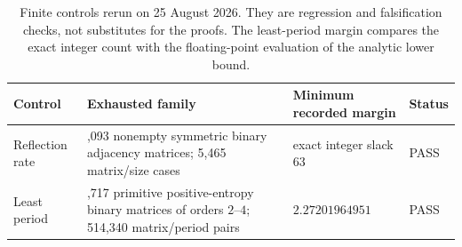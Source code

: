 \begin{table}[H]
\caption{Finite controls rerun on 25 August 2026.  They are regression and
falsification checks, not substitutes for the proofs.  The least-period
margin compares the exact integer count with the floating-point evaluation
of the analytic lower bound.}
\label{tab:controls}
\centering
\small
\renewcommand{\arraystretch}{1.12}
\begin{tabularx}{\textwidth}{@{}>{\raggedright\arraybackslash}p{}
  >{\raggedright\arraybackslash}p{}
  >{\raggedright\arraybackslash}p{}X@{}}
\toprule
Control & Exhausted family & Minimum recorded margin & Status \\
\midrule
Reflection rate
& 1,093 nonempty symmetric binary adjacency matrices; 5,465 matrix/size cases
& exact integer slack $63$ & PASS \\
Least period
& 25,717 primitive positive-entropy binary matrices of orders $2$--$4$;
514,340 matrix/period pairs
& $2.27201964951$ & PASS \\
\bottomrule
\end{tabularx}
\end{table}
